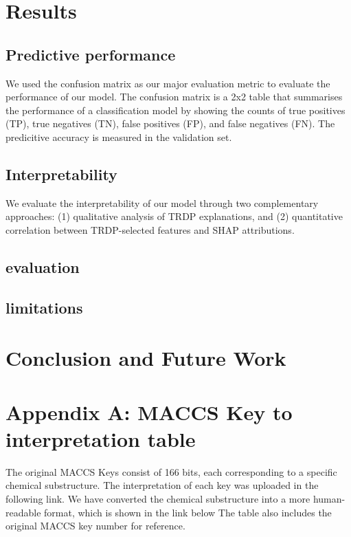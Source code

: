 \documentclass[letterpaper]{article} %
\begin{document}
\section{Results}
\subsection{Predictive performance}
We used the confusion matrix as our major evaluation metric to evaluate the performance of our model. The confusion matrix is a 2x2 table that summarises the performance of a classification model by showing the counts of true positives (TP), true negatives (TN), false positives (FP), and false negatives (FN). The predicitive accuracy is measured in the validation set. 

\subsection{Interpretability}
We evaluate the interpretability of our model through two complementary approaches: (1) qualitative analysis of TRDP explanations, and (2) quantitative correlation between TRDP-selected features and SHAP attributions.


\subsection{evaluation}
\subsection{limitations}
\section{Conclusion and Future Work}

\section{Appendix A: MACCS Key to interpretation table}
The original MACCS Keys consist of 166 bits, each corresponding to a specific chemical substructure. The interpretation of each key was uploaded in the following link. We have converted the chemical substructure into a more human-readable format, which is shown in the link below The table also includes the original MACCS key number for reference.
\end{document}
